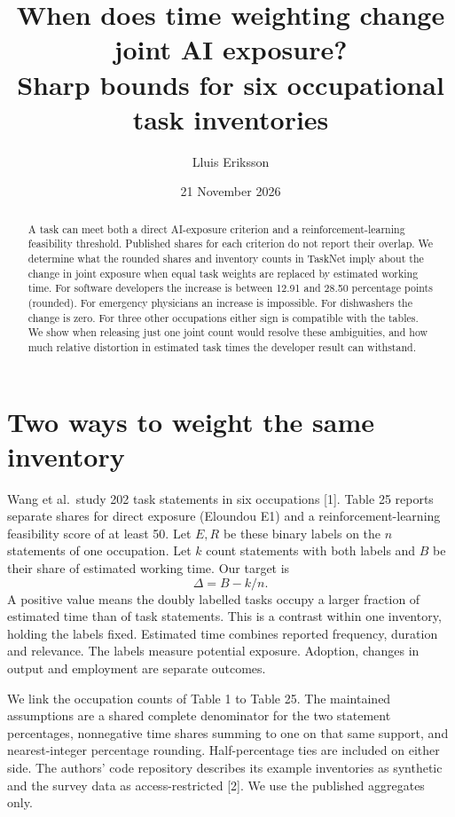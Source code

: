 \documentclass[11pt]{article}
\title{When does time weighting change joint AI exposure?\\Sharp bounds for six occupational task inventories}
\author{Lluis Eriksson}\date{21 November 2026}
\begin{document}
\maketitle
\begin{abstract}
A task can meet both a direct AI-exposure criterion and a reinforcement-learning feasibility threshold. Published shares for each criterion do not report their overlap. We determine what the rounded shares and inventory counts in TaskNet imply about the change in joint exposure when equal task weights are replaced by estimated working time. For software developers the increase is between 12.91 and 28.50 percentage points (rounded). For emergency physicians an increase is impossible. For dishwashers the change is zero. For three other occupations either sign is compatible with the tables. We show when releasing just one joint count would resolve these ambiguities, and how much relative distortion in estimated task times the developer result can withstand.
\end{abstract}
\section{Two ways to weight the same inventory}
Wang et al.\ study 202 task statements in six occupations [1]. Table 25 reports separate shares for direct exposure (Eloundou E1) and a reinforcement-learning feasibility score of at least 50. Let $E,R$ be these binary labels on the $n$ statements of one occupation. Let $k$ count statements with both labels and $B$ be their share of estimated working time. Our target is
\[
                 \Delta=B-k/n .
\]
A positive value means the doubly labelled tasks occupy a larger fraction of estimated time than of task statements. This is a contrast within one inventory, holding the labels fixed. Estimated time combines reported frequency, duration and relevance. The labels measure potential exposure. Adoption, changes in output and employment are separate outcomes.

We link the occupation counts of Table 1 to Table 25. The maintained assumptions are a shared complete denominator for the two statement percentages, nonnegative time shares summing to one on that same support, and nearest-integer percentage rounding. Half-percentage ties are included on either side. The authors' code repository describes its example inventories as synthetic and the survey data as access-restricted [2]. We use the published aggregates only.
\newpage
\end{document}
